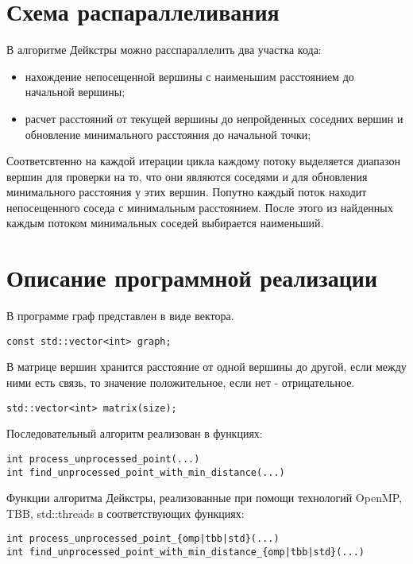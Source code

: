 \documentclass{report}
\begin{document}
\section*{Схема распараллеливания}
В алгоритме Дейкстры можно расспараллелить два участка кода:
\begin{itemize}
\item нахождение непосещенной вершины с наименьшим расстоянием до начальной вершины;
\item расчет расстояний от текущей вершины до непройденных соседних вершин и обновление минимального расстояния до начальной точки;  
\end{itemize}
\par Соответсвтенно на каждой итерации цикла каждому потоку выделяется диапазон вершин для проверки на то, что они являются соседями и для обновления минимального расстояния у этих вершин. Попутно каждый поток находит непосещенного соседа с минимальным расстоянием. После этого из найденных каждым потоком минимальных соседей выбирается наименьший.  
\newpage

\section*{Описание программной реализации}
В программе граф представлен в виде вектора. 
\begin{lstlisting}
const std::vector<int> graph;
\end{lstlisting}
В матрице вершин хранится расстояние от одной вершины до другой, если между ними есть связь, то значение положительное, если нет - отрицательное.
\begin{lstlisting}
std::vector<int> matrix(size);
\end{lstlisting}

Последовательный алгоритм реализован в функциях:
\begin{lstlisting}
int process_unprocessed_point(...)
int find_unprocessed_point_with_min_distance(...)
\end{lstlisting}
\begin{sloppypar}
Функции алгоритма Дейкстры, реализованные при помощи технологий OpenMP, TBB, std::threads в соответствующих функциях:
\end{sloppypar}
\begin{lstlisting}
int process_unprocessed_point_{omp|tbb|std}(...)
int find_unprocessed_point_with_min_distance_{omp|tbb|std}(...)
\end{lstlisting}
\end{document}
